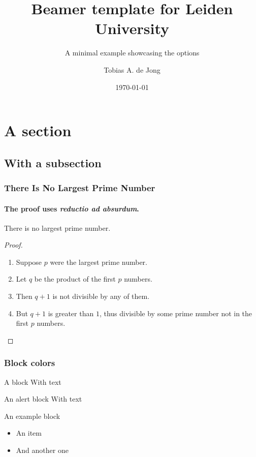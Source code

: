 \documentclass[9pt,aspectratio=34,english]{beamer}
\title{Beamer template for Leiden University}
\subtitle{A minimal example showcasing the options}
\author{Tobias A. de Jong}
\institute[LION]{Leiden Institute of Physics}
\date{\today}
\begin{document}
\begin{frame}
	\titlepage
\end{frame}

\begin{frame}
	\tableofcontents
\end{frame}

\section{A section}
\subsection{With a subsection}

\begin{frame}
	\frametitle{There Is No Largest Prime Number}
	\framesubtitle{The proof uses \textit{reductio ad absurdum}.}
	\begin{theorem}
		There is no largest prime number.
	\end{theorem}
	\begin{proof}
		\begin{enumerate}
			\item<1-| alert@1> Suppose $p$ were the largest prime number.
			\item<2-> Let $q$ be the product of the first $p$ numbers.
			\item<3-> Then $q+1$ is not divisible by any of them.
			\item<1-> But $q + 1$ is greater than $1$, thus divisible by some prime
				number not in the first $p$ numbers.\qedhere
		\end{enumerate}
	\end{proof}
\end{frame}

\begin{frame}
	\frametitle{Block colors}
	\begin{block}{A block}
		With text
	\end{block}
	\begin{alertblock}{An alert block}
		With text
	\end{alertblock}
	\begin{exampleblock}{An example block}
		\begin{itemize}
			\item An item
			\item And another one
		\end{itemize}
	\end{exampleblock}
\end{frame}
\end{document}
